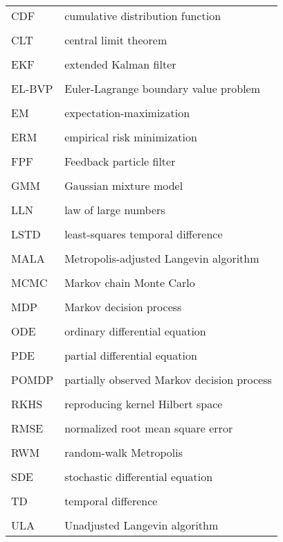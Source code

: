 \begin{tabular}{l p{5in}} %
	CDF & cumulative distribution function \\
	\\
	CLT &  central limit theorem\\
	\\
	EKF & extended Kalman filter \\
	\\
	EL-BVP & Euler-Lagrange boundary value problem\\
	\\
	EM & expectation-maximization\\
	\\
	ERM & empirical risk minimization\\
	\\
	FPF & Feedback particle filter\\
	\\
	GMM & Gaussian mixture model\\
	\\
	LLN & law of large numbers \\
	\\
	LSTD & least-squares temporal difference \\
	\\
	MALA & Metropolis-adjusted Langevin algorithm \\
	\\
	MCMC & Markov chain Monte Carlo \\
	\\
	MDP & Markov decision process \\
	\\
	ODE & ordinary differential equation \\
	\\
	PDE & partial differential equation \\
	\\
	POMDP & partially observed Markov decision process \\
	\\	
	RKHS & reproducing kernel Hilbert space \\
	\\
	RMSE & normalized root mean square error\\
	\\
	RWM & random-walk Metropolis\\
	\\
	SDE & stochastic differential equation\\
	\\
	TD & temporal difference\\
	\\
	ULA & Unadjusted Langevin algorithm
\end{tabular}

\doublespacing
